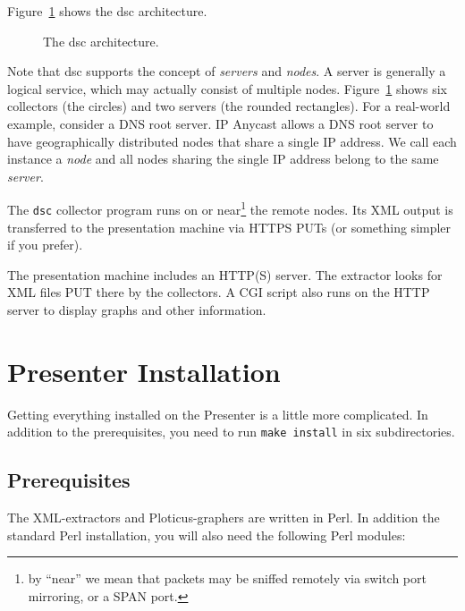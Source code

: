 \documentclass{report}
\def\dsc{{\sc dsc}}
\begin{document}
Figure~\ref{fig-architecture} shows the {\dsc} architecture.  

\begin{figure}
\centerline{}
\caption{\label{fig-architecture}The {\dsc} architecture.}
\end{figure}

Note that {\dsc} supports the concept of {\em servers\/} and {\em
nodes\/}.  A server is generally a logical service, which may
actually consist of multiple nodes.  Figure~\ref{fig-architecture}
shows six collectors (the circles) and two servers (the rounded
rectangles).  For a real-world example, consider a DNS root server.
IP Anycast allows a DNS root server to have geographically distributed
nodes that share a single IP address.  We call each instance a 
{\em node\/} and all nodes sharing the single IP address belong
to the same {\em server\/}.

The {\tt dsc\/} collector program runs on or near\footnote{by
``near'' we mean that packets may be sniffed remotely via switch
port mirroring, or a SPAN port.} the remote nodes.  Its XML output
is transferred to the presentation machine via HTTPS PUTs (or something simpler
if you prefer).

The presentation machine includes an HTTP(S) server.  The extractor looks
for XML files PUT there by the collectors.  A CGI script also runs on
the HTTP server to display graphs and other information.


\chapter{Presenter Installation}

Getting everything installed on the Presenter is a little more complicated.
In addition to the prerequisites, you need to run {\tt make install\/} in
six subdirectories.

\section{Prerequisites}

The XML-extractors and Ploticus-graphers are written in Perl.  In addition the
standard Perl installation, you will also need the following Perl modules:
\end{document}
